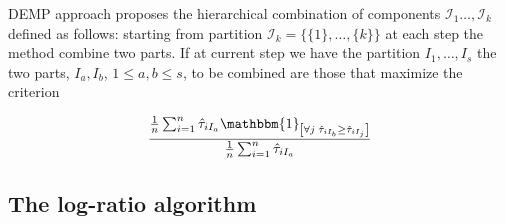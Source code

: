 \documentclass[10pt, a4paper]{article}
\begin{document}
DEMP approach \citep{hennig2010methods} proposes the hierarchical combination of components  $\mathcal{I}_1 \dots, \mathcal{I}_k$ defined as follows: starting from partition $\mathcal{I}_k = \{\{1\},\dots, \{k\}\}$ at each step the method combine two parts. If at current step we have the partition  $I_1, \dots, I_s$ the two parts, $I_a, I_b$, $1 \leq a,b \leq s$,  to be combined are those that maximize the criterion

\[
\frac{ \frac{1}{n} \sum_{i=1}^n {\hat{\tau}_{iI_a} \mathbbm{1}_{\left[ \forall j\; \hat{\tau}_{i I_{b}} \geq \hat{\tau}_{iI_j} \right]}}}{ \frac{1}{n} \sum_{i=1}^n \hat{\tau}_{iI_a}}
\]

\subsection*{The log-ratio algorithm}


{}
\end{document}
